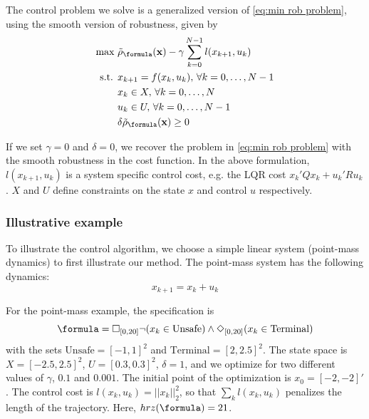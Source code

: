
The control problem we solve is a generalized version of \eqref{eq:min rob problem}, using the smooth version of robustness, given by
\begin{subequations}
\label{eq:general_ctrl}
\begin{align}
\text{max } & \srob_{\formula}(\sstraj) - \gamma \sum_{k=0}^{N-1} l(x_{k+1},u_{k}) \\
\text{s.t. } & x_{k+1} = f(x_k,u_k), \, \forall k=0,\dotsc,N-1 \\
 & x_k \in X, \, \forall k=0,\dotsc,N \\
 & u_k \in U, \, \forall k=0,\dotsc,N-1 \\
 & \delta \srob_{\formula}(\sstraj) \geq 0
\end{align}
\end{subequations}

If we set $\gamma=0$ and $\delta=0$, we recover the problem in \eqref{eq:min rob problem} with the smooth robustness in the cost function. In the above formulation, $l(x_{k+1},u_{k})$ is a system specific control cost, e.g. the LQR cost $x_k'Qx_k + u_k'Ru_k$. $X$ and $U$ define constraints on the state $x$ and control $u$ respectively. 

\subsubsection{Illustrative example}
\label{sec:illustrative example}
To illustrate the control algorithm, we choose a simple linear system (point-mass dynamics) to first illustrate our method. The point-mass system has the following dynamics:
\begin{equation}
\label{eq:PointMass}
x_{k+1} = x_k + u_k
\end{equation}

For the point-mass example, the specification is 
\[\formula = \always_{[0,20]} \neg (x_k \in \text{Unsafe}) \land \eventually_{[0,20]} (x_k \in \text{Terminal})\]
with the sets $\text{Unsafe}=[-1,1]^2$ and $\text{Terminal}=[2,2.5]^2$. 
The state space is $X=[-2.5,2.5]^2$, $U=[0.3,0.3]^2$, $\delta=1$, and we optimize for two different values of $\gamma$, $0.1$ and $0.001$.
The initial point of the optimization is $x_0=[-2,-2]'$. 
The control cost is $l(x_k,u_k) = ||x_k||_{2}^2$, so that $\sum_kl(x_k,u_k)$ penalizes the length of the trajectory. Here, $hrz(\formula) = 21$.

